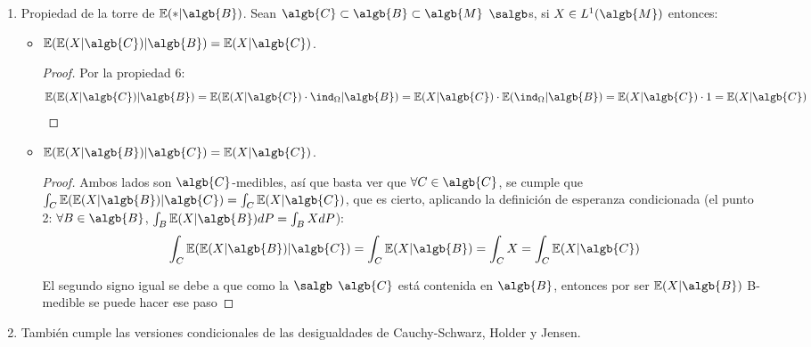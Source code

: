 \documentclass{apuntes}
\begin{document}
\begin{enumerate}
\begin{proof}
\begin{itemize}
\end{itemize}

\end{proof}

\item Propiedad de la torre de $\mathbb{E}(*|\algb{B})$. Sean $\algb{C} \subset \algb{B} \subset \algb{M}$ $\salgb$s, si $X \in L^ 1(\algb{M})$ entonces:
\begin{itemize}
\item $\mathbb{E}(\mathbb{E}(X|\algb{C})|\algb{B}) = \mathbb{E}(X|\algb{C})$.
\begin{proof}
Por la propiedad 6:
\[
\mathbb{E}(\mathbb{E}(X|\algb{C})|\algb{B}) = \mathbb{E}(\mathbb{E}(X|\algb{C}) \cdot \ind_{\Omega}|\algb{B}) = \mathbb{E}(X|\algb{C}) \cdot \mathbb{E}(\ind_{\Omega}|\algb{B}) = \mathbb{E}(X|\algb{C}) \cdot 1 = \mathbb{E}(X|\algb{C})
\]
\end{proof}
\item $\mathbb{E}(\mathbb{E}(X|\algb{B})|\algb{C}) = \mathbb{E}(X|\algb{C})$.
\begin{proof}
Ambos lados son $\algb{C}$-medibles, así que basta ver que $\forall C \in \algb{C}$, se cumple que $\int_C \mathbb{E}(\mathbb{E}(X|\algb{B})|\algb{C}) = \int_C \mathbb{E}(X|\algb{C})$, que es cierto, aplicando la definición de esperanza condicionada (el punto 2: $\forall B \in \algb{B}$, $\int_{B}\mathbb{E}(X|\algb{B})dP=\int_{B}XdP$):
\[
\int_C \mathbb{E}(\mathbb{E}(X|\algb{B})|\algb{C}) = \int_C \mathbb{E}(X|\algb{B}) = \int_C X = \int_C \mathbb{E}(X|\algb{C})
\] 

El segundo signo igual se debe a que como la $\salgb$ $\algb{C}$ está contenida en $\algb{B}$, entonces por ser $\mathbb{E}(X|\algb{B})$ B-medible se puede hacer ese paso

\end{proof}
\end{itemize}
\item También cumple las versiones condicionales de las desigualdades de Cauchy-Schwarz, Holder y Jensen.
\end{enumerate}
\end{document}
